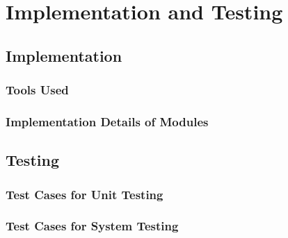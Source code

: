 \chapter{Implementation and Testing}

\section{Implementation}

\subsection{Tools Used}

\subsection{Implementation Details of Modules}

\section{Testing}

\subsection{Test Cases for Unit Testing}

\subsection{Test Cases for System Testing}
